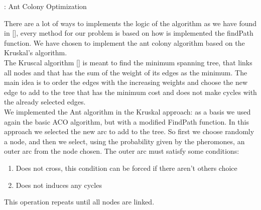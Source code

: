 \begin{algorithm}
\caption{: Ant Colony Optimization} \label{alg:Ant}
\begin{algorithmic} 
\REPEAT
{}
\end{algorithmic}
\end{algorithm}

There are a lot of ways to implements the logic of the algorithm as we have found in [\cite{nedlin2017ant}], every method for our problem is based on how is implemented the findPath function. We have chosen to implement the ant colony algorithm based on the Kruskal’s algorithm. \\
The Kruscal algorithm [\cite{kruskal1956shortest}] is meant to find the minimum spanning tree, that links all nodes and that has the sum of the weight of its edges as the minimum. The main idea is to order the edges with the increasing weights and choose the new edge to add to the tree that has the minimum cost and does not make cycles with the already selected edges.\\
We implemented the Ant algorithm in the Kruskal approach: as a basis we used again the basic ACO algorithm, but with a modified FindPath function. In this approach we selected the new arc to add to the tree. So first we choose randomly a node, and then we select, using the probability given by the pheromones, an outer arc from the node chosen. The outer arc must satisfy some conditions:
\begin{enumerate}
\setlength{\parskip}{0pt}
\setlength{\itemsep}{0pt plus 1pt}
\item Does not cross, this condition can be forced if there aren’t others choice
\item Does not induces any cycles
\end{enumerate}
This operation repeats until all nodes are linked.

